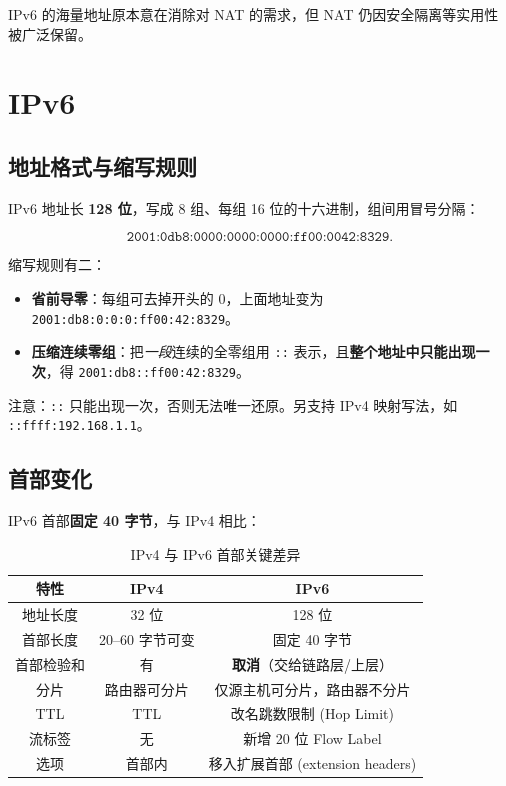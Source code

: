 \noindent IPv6 的海量地址原本意在消除对 NAT 的需求，但 NAT 仍因安全隔离等实用性被广泛保留。

\section{IPv6}

\subsection{地址格式与缩写规则}

IPv6 地址长 \textbf{128 位}，写成 8 组、每组 16 位的十六进制，组间用冒号分隔：

\begin{equation}
    \texttt{2001:0db8:0000:0000:0000:ff00:0042:8329}.
\end{equation}

\noindent 缩写规则有二：

\begin{itemize}
    \item \textbf{省前导零}：每组可去掉开头的 $0$，上面地址变为 \texttt{2001:db8:0:0:0:ff00:42:8329}。
    \item \textbf{压缩连续零组}：把\emph{一段}连续的全零组用 \texttt{::} 表示，且\textbf{整个地址中只能出现一次}，得 \texttt{2001:db8::ff00:42:8329}。
\end{itemize}

\noindent 注意：\texttt{::} 只能出现一次，否则无法唯一还原。另支持 IPv4 映射写法，如 \texttt{::ffff:192.168.1.1}。

\subsection{首部变化}

IPv6 首部\textbf{固定 40 字节}，与 IPv4 相比：

\begin{table}[H]
\centering
\caption{IPv4 与 IPv6 首部关键差异}
\begin{tabulary}{\textwidth}{CCC}
\toprule
特性 & IPv4 & IPv6 \\
\midrule
地址长度 & 32 位 & 128 位 \\
首部长度 & 20--60 字节可变 & 固定 40 字节 \\
首部检验和 & 有 & \textbf{取消}（交给链路层/上层） \\
分片 & 路由器可分片 & 仅源主机可分片，路由器不分片 \\
TTL & TTL & 改名跳数限制 (Hop Limit) \\
流标签 & 无 & 新增 20 位 Flow Label \\
选项 & 首部内 & 移入扩展首部 (extension headers) \\
\bottomrule
\end{tabulary}
\end{table}

